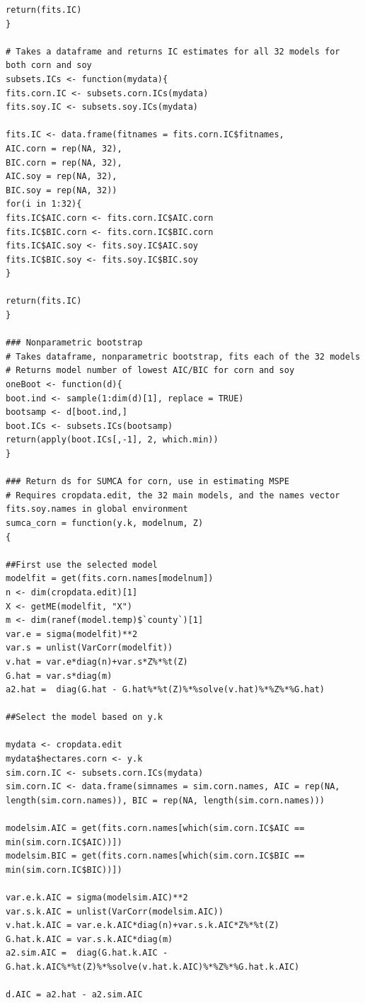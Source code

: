 \documentclass{article}
\begin{document}
\begin{Verbatim}[fontsize=\tiny]
return(fits.IC)
}

# Takes a dataframe and returns IC estimates for all 32 models for both corn and soy
subsets.ICs <- function(mydata){
fits.corn.IC <- subsets.corn.ICs(mydata)
fits.soy.IC <- subsets.soy.ICs(mydata)

fits.IC <- data.frame(fitnames = fits.corn.IC$fitnames,
AIC.corn = rep(NA, 32),
BIC.corn = rep(NA, 32),
AIC.soy = rep(NA, 32),
BIC.soy = rep(NA, 32))
for(i in 1:32){
fits.IC$AIC.corn <- fits.corn.IC$AIC.corn
fits.IC$BIC.corn <- fits.corn.IC$BIC.corn
fits.IC$AIC.soy <- fits.soy.IC$AIC.soy
fits.IC$BIC.soy <- fits.soy.IC$BIC.soy
}

return(fits.IC)
}

### Nonparametric bootstrap
# Takes dataframe, nonparametric bootstrap, fits each of the 32 models
# Returns model number of lowest AIC/BIC for corn and soy
oneBoot <- function(d){
boot.ind <- sample(1:dim(d)[1], replace = TRUE)
bootsamp <- d[boot.ind,]
boot.ICs <- subsets.ICs(bootsamp)
return(apply(boot.ICs[,-1], 2, which.min))
}

### Return ds for SUMCA for corn, use in estimating MSPE
# Requires cropdata.edit, the 32 main models, and the names vector fits.soy.names in global environment
sumca_corn = function(y.k, modelnum, Z)
{

##First use the selected model
modelfit = get(fits.corn.names[modelnum])
n <- dim(cropdata.edit)[1]
X <- getME(modelfit, "X")
m <- dim(ranef(model.temp)$`county`)[1]
var.e = sigma(modelfit)**2
var.s = unlist(VarCorr(modelfit))
v.hat = var.e*diag(n)+var.s*Z%*%t(Z)
G.hat = var.s*diag(m)
a2.hat =  diag(G.hat - G.hat%*%t(Z)%*%solve(v.hat)%*%Z%*%G.hat)

##Select the model based on y.k

mydata <- cropdata.edit
mydata$hectares.corn <- y.k
sim.corn.IC <- subsets.corn.ICs(mydata)
sim.corn.IC <- data.frame(simnames = sim.corn.names, AIC = rep(NA, length(sim.corn.names)), BIC = rep(NA, length(sim.corn.names)))

modelsim.AIC = get(fits.corn.names[which(sim.corn.IC$AIC == min(sim.corn.IC$AIC))])
modelsim.BIC = get(fits.corn.names[which(sim.corn.IC$BIC == min(sim.corn.IC$BIC))])

var.e.k.AIC = sigma(modelsim.AIC)**2
var.s.k.AIC = unlist(VarCorr(modelsim.AIC))
v.hat.k.AIC = var.e.k.AIC*diag(n)+var.s.k.AIC*Z%*%t(Z)
G.hat.k.AIC = var.s.k.AIC*diag(m)
a2.sim.AIC =  diag(G.hat.k.AIC - G.hat.k.AIC%*%t(Z)%*%solve(v.hat.k.AIC)%*%Z%*%G.hat.k.AIC)

d.AIC = a2.hat - a2.sim.AIC


\end{Verbatim}
\end{document}
